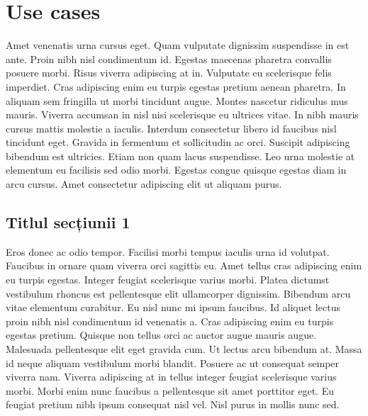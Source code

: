 \chapter{Use cases}

Amet venenatis urna cursus eget. Quam vulputate dignissim suspendisse in est ante. Proin nibh nisl condimentum id. Egestas maecenas pharetra convallis posuere morbi. Risus viverra adipiscing at in. Vulputate eu scelerisque felis imperdiet. Cras adipiscing enim eu turpis egestas pretium aenean pharetra. In aliquam sem fringilla ut morbi tincidunt augue. Montes nascetur ridiculus mus mauris. Viverra accumsan in nisl nisi scelerisque eu ultrices vitae. In nibh mauris cursus mattis molestie a iaculis. Interdum consectetur libero id faucibus nisl tincidunt eget. Gravida in fermentum et sollicitudin ac orci. Suscipit adipiscing bibendum est ultricies. Etiam non quam lacus suspendisse. Leo urna molestie at elementum eu facilisis sed odio morbi. Egestas congue quisque egestas diam in arcu cursus. Amet consectetur adipiscing elit ut aliquam purus.

\section{Titlul secțiunii 1}

Eros donec ac odio tempor. Facilisi morbi tempus iaculis urna id volutpat. Faucibus in ornare quam viverra orci sagittis eu. Amet tellus cras adipiscing enim eu turpis egestas. Integer feugiat scelerisque varius morbi. Platea dictumst vestibulum rhoncus est pellentesque elit ullamcorper dignissim. Bibendum arcu vitae elementum curabitur. Eu nisl nunc mi ipsum faucibus. Id aliquet lectus proin nibh nisl condimentum id venenatis a. Cras adipiscing enim eu turpis egestas pretium. Quisque non tellus orci ac auctor augue mauris augue. Malesuada pellentesque elit eget gravida cum. Ut lectus arcu bibendum at. Massa id neque aliquam vestibulum morbi blandit. Posuere ac ut consequat semper viverra nam. Viverra adipiscing at in tellus integer feugiat scelerisque varius morbi. Morbi enim nunc faucibus a pellentesque sit amet porttitor eget. Eu feugiat pretium nibh ipsum consequat nisl vel. Nisl purus in mollis nunc sed.
